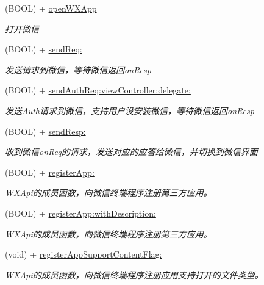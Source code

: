 \begin{DoxyCompactItemize}
(B\+O\+OL) + \mbox{\hyperlink{interface_w_x_api_ac238ad8f1aa670ea9b26836f77701dc2}{open\+W\+X\+App}}
\begin{DoxyCompactList}\small\item\em 打开微信 \end{DoxyCompactList}\item 
(B\+O\+OL) + \mbox{\hyperlink{interface_w_x_api_a1a30bc4f39815920b6e45901375bee8e}{send\+Req\+:}}
\begin{DoxyCompactList}\small\item\em 发送请求到微信，等待微信返回on\+Resp \end{DoxyCompactList}\item 
(B\+O\+OL) + \mbox{\hyperlink{interface_w_x_api_a646e42926ec7378a087674e54150b2c9}{send\+Auth\+Req\+:view\+Controller\+:delegate\+:}}
\begin{DoxyCompactList}\small\item\em 发送\+Auth请求到微信，支持用户没安装微信，等待微信返回on\+Resp \end{DoxyCompactList}\item 
(B\+O\+OL) + \mbox{\hyperlink{interface_w_x_api_ab026294e5601cd15d7b792c3de7b81d5}{send\+Resp\+:}}
\begin{DoxyCompactList}\small\item\em 收到微信on\+Req的请求，发送对应的应答给微信，并切换到微信界面 \end{DoxyCompactList}\item 
(B\+O\+OL) + \mbox{\hyperlink{interface_w_x_api_a84341d7a4aea16c2fd6e74708a569564}{register\+App\+:}}
\begin{DoxyCompactList}\small\item\em W\+X\+Api的成员函数，向微信终端程序注册第三方应用。 \end{DoxyCompactList}\item 
(B\+O\+OL) + \mbox{\hyperlink{interface_w_x_api_a76af46b7bb7e49aef40476a0dc377472}{register\+App\+:with\+Description\+:}}
\begin{DoxyCompactList}\small\item\em W\+X\+Api的成员函数，向微信终端程序注册第三方应用。 \end{DoxyCompactList}\item 
(void) + \mbox{\hyperlink{interface_w_x_api_a3a8dd85dbe67ae84d4c75d674d781c9b}{register\+App\+Support\+Content\+Flag\+:}}
\begin{DoxyCompactList}\small\item\em W\+X\+Api的成员函数，向微信终端程序注册应用支持打开的文件类型。 \end{DoxyCompactList}\item 

\end{DoxyCompactItemize}
